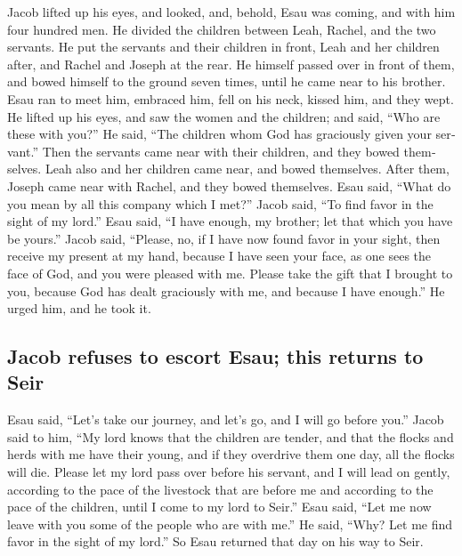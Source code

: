 \begin{paracol}{2}
\begin{otherlanguage}{english}
 Jacob lifted up his eyes, and looked, and, behold, Esau
was coming, and with him four hundred men. He divided the children
between Leah, Rachel, and the two servants.  He put the
servants and their children in front, Leah and her children after, and
Rachel and Joseph at the rear.  He himself passed over in
front of them, and bowed himself to the ground seven times, until he
came near to his brother.  Esau ran to meet him, embraced
him, fell on his neck, kissed him, and they wept.  He
lifted up his eyes, and saw the women and the children; and said, ``Who
are these with you?'' He said, ``The children whom God has graciously
given your servant.''  Then the servants came near with
their children, and they bowed themselves.  Leah also and
her children came near, and bowed themselves. After them, Joseph came
near with Rachel, and they bowed themselves.  Esau said,
``What do you mean by all this company which I met?'' Jacob said, ``To
find favor in the sight of my lord.''  Esau said, ``I have
enough, my brother; let that which you have be yours.'' 
Jacob said, ``Please, no, if I have now found favor in your sight, then
receive my present at my hand, because I have seen your face, as one
sees the face of God, and you were pleased with me. 
Please take the gift that I brought to you, because God has dealt
graciously with me, and because I have enough.'' He urged him, and he
took it.

\hypertarget{jacob-refuses-to-escort-esau-this-returns-to-seir}{%
\subsection{Jacob refuses to escort Esau; this returns to
Seir}\label{jacob-refuses-to-escort-esau-this-returns-to-seir}}

 Esau said, ``Let's take our journey, and let's go, and I
will go before you.''  Jacob said to him, ``My lord knows
that the children are tender, and that the flocks and herds with me have
their young, and if they overdrive them one day, all the flocks will
die.  Please let my lord pass over before his servant,
and I will lead on gently, according to the pace of the livestock that
are before me and according to the pace of the children, until I come to
my lord to Seir.''  Esau said, ``Let me now leave with
you some of the people who are with me.'' He said, ``Why? Let me find
favor in the sight of my lord.''  So Esau returned that
day on his way to Seir.


\end{otherlanguage}
\end{paracol}
